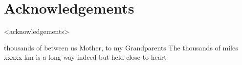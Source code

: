 %
%
\chapter*{Acknowledgements}

<acknowledgements>






%
%

%
thousands of  between us
Mother, 
to my Grandparents
The thousands of miles
    xxxxx km is a long way indeed
    but held close to heart

